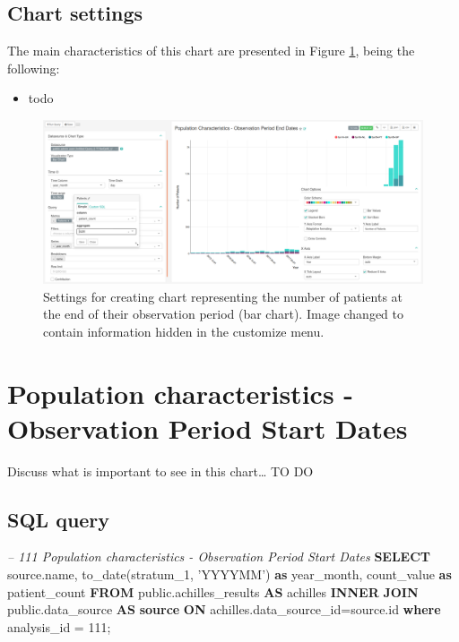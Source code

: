 \documentclass[]{book}
\newenvironment{Shaded}{\begin{snugshade}}{\end{snugshade}}
\newcommand{\KeywordTok}[1]{\textcolor[rgb]{0.13,0.29,0.53}{\textbf{#1}}}
\newcommand{\DecValTok}[1]{\textcolor[rgb]{0.00,0.00,0.81}{#1}}
\newcommand{\StringTok}[1]{\textcolor[rgb]{0.31,0.60,0.02}{#1}}
\newcommand{\CommentTok}[1]{\textcolor[rgb]{0.56,0.35,0.01}{\textit{#1}}}
\newcommand{\FunctionTok}[1]{\textcolor[rgb]{0.00,0.00,0.00}{#1}}
\newcommand{\NormalTok}[1]{#1}
\providecommand{\tightlist}{%
  \setlength{\itemsep}{0pt}\setlength{\parskip}{0pt}}
\begin{document}
\subsection{Chart settings}\label{chart-settings-11}

The main characteristics of this chart are presented in Figure
\ref{fig:populationCharacteristicsObservationPeriodEndDates}, being the
following:

\begin{itemize}
\tightlist
\item
  todo
\end{itemize}

\begin{figure}
\includegraphics[width=1\linewidth]{images/populationCharacteristicsObservationPeriodEndDates} \caption{Settings for creating chart representing the number of patients at the end of their observation period (bar chart). Image changed to contain information hidden in the customize menu.}\label{fig:populationCharacteristicsObservationPeriodEndDates}
\end{figure}

\section{Population characteristics - Observation Period Start
Dates}\label{population-characteristics---observation-period-start-dates}

Discuss what is important to see in this chart\ldots{} TO DO

\subsection{SQL query}\label{sql-query-12}

\begin{Shaded}
\begin{Highlighting}[]
\CommentTok{-- 111  Population characteristics - Observation Period Start Dates}
\KeywordTok{SELECT}\NormalTok{ source.name,}
       \FunctionTok{to_date}\NormalTok{(stratum_1, }\StringTok{'YYYYMM'}\NormalTok{) }\KeywordTok{as}\NormalTok{ year_month,}
\NormalTok{       count_value }\KeywordTok{as}\NormalTok{ patient_count}
\KeywordTok{FROM}\NormalTok{ public.achilles_results }\KeywordTok{AS}\NormalTok{ achilles }\KeywordTok{INNER} \KeywordTok{JOIN} 
\NormalTok{    public.data_source }\KeywordTok{AS} \KeywordTok{source} \KeywordTok{ON}\NormalTok{ achilles.data_source_id=source.id}
\KeywordTok{where}\NormalTok{ analysis_id = }\DecValTok{111}\NormalTok{;}
\end{Highlighting}
\end{Shaded}
\end{document}
